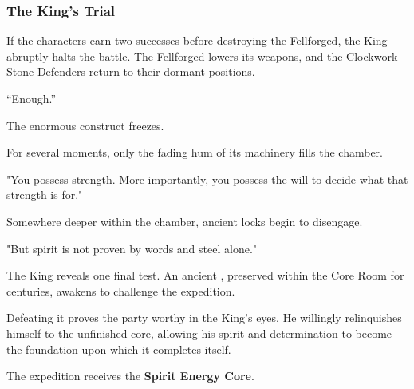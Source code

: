 \subsubsection*{The King's Trial}
{\entryfont If the characters earn two successes before destroying the Fellforged, the King abruptly halts the battle. The Fellforged lowers its weapons, and the Clockwork Stone Defenders return to their dormant positions.}
\begin{DndReadAloud}
	“Enough.”

	The enormous construct freezes.

	For several moments, only the fading hum of its machinery fills the chamber.

	"You possess strength. More importantly, you possess the will to decide what that strength is for."

	Somewhere deeper within the chamber, ancient locks begin to disengage.

	"But spirit is not proven by words and steel alone."
\end{DndReadAloud}
{\noindent\entryfont The King reveals one final test. An ancient \hyperref[monster:WarforgedTitan]{}, preserved within the Core Room for centuries, awakens to challenge the expedition.

Defeating it proves the party worthy in the King's eyes. He willingly relinquishes himself to the unfinished core, allowing his spirit and determination to become the foundation upon which it completes itself.

The expedition receives the \textbf{Spirit Energy Core}.}